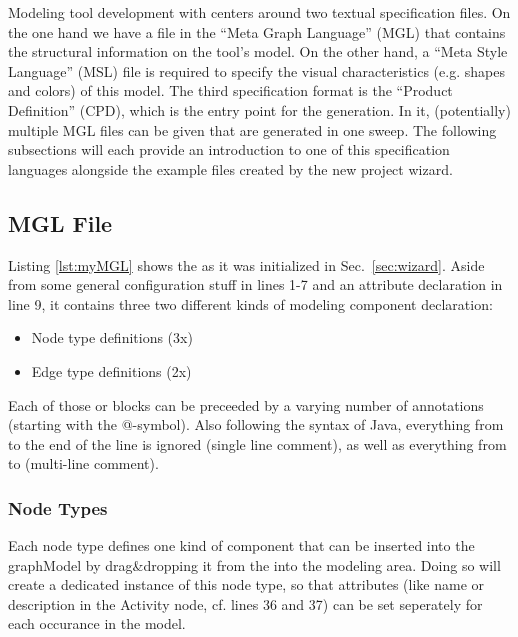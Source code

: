\documentclass[a4paper,american,12pt]{scrreprt}
\begin{document}
Modeling tool development with \cinco centers around two textual specification
files. On the one hand we have a file in the ``Meta Graph Language'' (MGL) that
contains the structural information on the tool's model. On the other hand, a
``Meta Style Language'' (MSL) file\footnotemark{} is required to specify the
visual characteristics (e.g.  shapes and colors) of this model. The third
specification format is the ``\cinco Product Definition'' (CPD), which is the
entry point for the generation. In it, (potentially) multiple MGL files can be
given that are generated in one sweep. The following
subsections will each provide an introduction to one of this specification
languages alongside the example files created by the new project wizard.


\subsection{MGL File} \label{sec:mgl} 


Listing \ref{lst:myMGL} shows the  as it was initialized in
Sec.~\ref{sec:wizard}. Aside from some general configuration stuff in lines
1-7 and an attribute declaration in line 9, it contains three two different kinds of modeling component declaration:
\begin{itemize}
\item Node type definitions (3x)
\item Edge type definitions (2x)
\end{itemize}

Each of those   or   blocks can be preceeded
by a varying number of annotations (starting with the @-symbol). Also following
the syntax of Java, everything from \code{//} to the end of the line is ignored
(single line comment), as well as everything from \code{/*} to \code{*/}
(multi-line comment).

\subsubsection{Node Types}

Each node type defines one kind of component that can be inserted into the
graphModel by drag\&dropping it from the  into the modeling area.
Doing so will create a dedicated instance of this node type, so that attributes
(like name or description in the Activity node, cf. lines 36 and 37) can be set
seperately for each occurance in the model.
\end{document}
